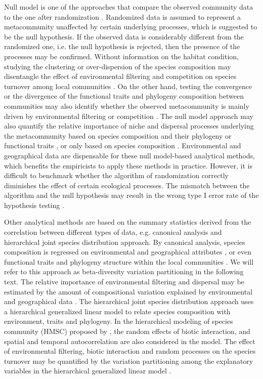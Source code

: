 Null model is one of the approaches that compare the observed community data to the one after randomization \citep{gotelli2006null, gotelli2012statistical}. Randomized data is assumed to represent a metacommunity unaffected by certain underlying processes, which is suggested to be the null hypothesis. If the observed data is considerably different from the randomized one, i.e. the null hypothesis is rejected, then the presence of the processes may be confirmed. Without information on the habitat condition, studying the clustering or over-dispersion of the species composition may disentangle the effect of environmental filtering and competition on species turnover among local communities \citep{diamond1975island, connor1979assembly, chase2011disentangling}. On the other hand, testing the convergence or the divergence of the functional traits and phylogeny composition between communities may also identify whether the observed metacommunity is mainly driven by environmental filtering or competition \citep{mayfield2010opposing, borics2020trait}. The null model approach may also quantify the relative importance of niche and dispersal processes underlying the metacommunity based on species composition and their phylogeny or functional traits \citep{stegen2013quantifying, ford2020functional}, or only based on species composition \citep{gibert2019per, vilmi2021dispersal}. Environmental and geographical data are dispensable for these null model-based analytical methods, which benefits the empiricists to apply these methods in practice. However, it is difficult to benchmark whether the algorithm of randomization correctly diminishes the effect of certain ecological processes. The mismatch between the algorithm and the null hypothesis may result in the wrong type I error rate of the hypothesis testing \citep{molina2020difficulties}.   

Other analytical methods are based on the summary statistics derived from the correlation between different types of data, e.g. canonical analysis and hierarchical joint species distribution approach. By canonical analysis, species composition is regressed on environmental and geographical attributes \citep{borcard1992partialling}, or even functional traits and phylogeny structure within the local communities \citep{sirbu2021variation}. We will refer to this approach as beta-diversity variation partitioning in the following text. The relative importance of environmental filtering and dispersal may be estimated by the amount of compositional variation explained by environmental and geographical data \citep{cottenie2005integrating}. The hierarchical joint species distribution approach uses a hierarchical generalized linear model to relate species composition with environment, traits and phylogeny. In the hierarchical modeling of species community (HMSC) proposed by \citet{ovaskainen2017make}, the random effects of biotic interaction, and spatial and temporal autocorrelation are also considered in the model. The effect of environmental filtering, biotic interaction and random processes on the species turnover may be quantified by the variation partitioning among the explanatory variables in the hierarchical generalized linear model \citep{ovaskainen2017make}.

